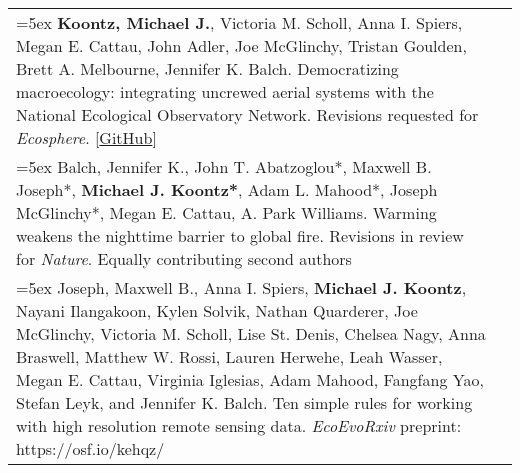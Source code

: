 \begin{longtable}{@{} >{\raggedright}p{6.25in} >{\raggedleft}X @{}}

\hangindent=5ex \textbf{Koontz, Michael J.}, Victoria M. Scholl, Anna I. Spiers, Megan E. Cattau, John Adler, Joe McGlinchy, Tristan Goulden, Brett A. Melbourne, Jennifer K. Balch. Democratizing macroecology: integrating uncrewed aerial systems with the National Ecological Observatory Network. Revisions requested for \emph{Ecosphere}. [\textcolor{blue}{\href{https://github.com/mikoontz/neon-drone-workflow}{GitHub}}] & \tabularnewline

\hangindent=5ex Balch, Jennifer K., John T. Abatzoglou*, Maxwell B. Joseph*, \textbf{Michael J. Koontz*}, Adam L. Mahood*, Joseph McGlinchy*, Megan E. Cattau, A. Park Williams. Warming weakens the nighttime barrier to global fire. Revisions in review for \emph{Nature}. 
\newline *Equally contributing second authors & \tabularnewline

\hangindent=5ex Joseph, Maxwell B., Anna I. Spiers, \textbf{Michael J. Koontz}, Nayani Ilangakoon, Kylen Solvik, Nathan Quarderer, Joe McGlinchy, Victoria M. Scholl, Lise St. Denis, Chelsea Nagy, Anna Braswell, Matthew W. Rossi, Lauren Herwehe, Leah Wasser, Megan E. Cattau, Virginia Iglesias, Adam Mahood, Fangfang Yao, Stefan Leyk, and Jennifer K. Balch. Ten simple rules for working with high resolution remote sensing data.  \newline \emph{EcoEvoRxiv} preprint: https://osf.io/kehqz/ & \tabularnewline

\end{longtable}
